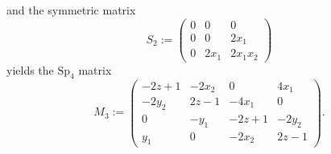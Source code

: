 \documentclass[11pt,leqno]{article}
\renewcommand{\1}{{\rm 1\hspace*{-0.4ex}%
\rule{0.1ex}{1.52ex}\hspace*{0.2ex}}}
\newcommand{\<}[1]{{\langle}#1 {\rangle}}
\theoremstyle{plain}
\theoremstyle{definition}
\theoremstyle{remark}
\numberwithin{equation}{section}
\begin{document}
and the symmetric matrix
\begin{equation*}
   S_2 :=  \begin{pmatrix}
        0& 0& 0\\ 0& 0& 2x_1\\ 0& 2x_1& 2x_1x_2
    \end{pmatrix}
\end{equation*}
yields the $\mathrm{Sp}_4$ matrix
\begin{equation*}
    M_3 := \begin{pmatrix}
    -2z+1& -2x_2& 0& 4x_1\\ -2y_2& 2z-1& -4x_1& 0\\ 0& -y_1& -2z+1& -2y_2\\ y_1& 0& -2x_2& 2z-1
\end{pmatrix}.
\end{equation*}
\end{document}
